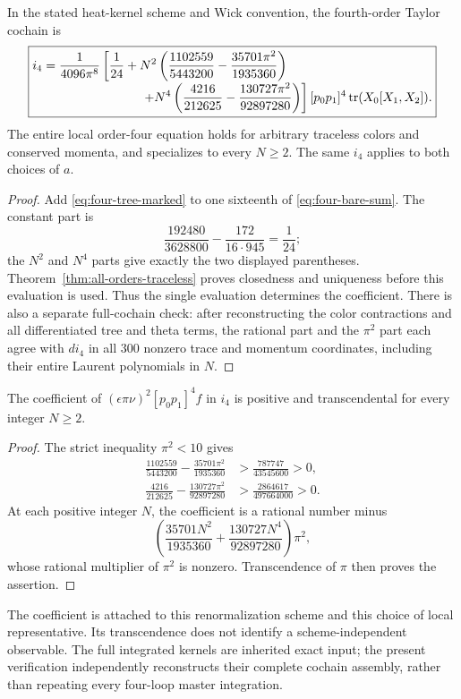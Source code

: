 \begin{theorem}
\label{thm:i4}
In the stated heat-kernel scheme and Wick convention, the
fourth-order Taylor cochain is
\begin{equation}
\boxed{\begin{aligned}
 i_4={}&\frac{1}{4096\pi^8}
 \left[
   \frac1{24}
   +N^2\left(\frac{1102559}{5443200}
                       -\frac{35701\pi^2}{1935360}\right)\right.\\[-1mm]
 &\left.\hspace{23mm}
   +N^4\left(\frac{4216}{212625}
                       -\frac{130727\pi^2}{92897280}\right)
 \right][p_0p_1]^4\tr(X_0[X_1,X_2]).
\end{aligned}}
\label{eq:i4}
\end{equation}
The entire local order-four equation holds for arbitrary
traceless colors and conserved momenta, and specializes to
every $N\ge2$. The same $i_4$ applies to both choices of $a$.
\end{theorem}

\begin{proof}
Add \eqref{eq:four-tree-marked} to one sixteenth of
\eqref{eq:four-bare-sum}. The constant part is
\[
 \frac{192480}{3628800}-\frac{172}{16\cdot945}
       =\frac1{24};
\]
the $N^2$ and $N^4$ parts give exactly the two displayed
parentheses. Theorem~\ref{thm:all-orders-traceless} proves
closedness and uniqueness before this evaluation is used.
Thus the single evaluation determines the coefficient.
There is also a separate full-cochain check: after reconstructing
the color contractions and all differentiated tree and theta
terms, the rational part and the $\pi^2$ part each agree with
$di_4$ in all $300$ nonzero trace and momentum coordinates,
including their entire Laurent polynomials in $N$.
\end{proof}

\begin{corollary}
The coefficient of
$(\epsilon\pi\nu)^2[p_0p_1]^4f$ in $i_4$ is positive and
transcendental for every integer $N\ge2$.
\end{corollary}
\begin{proof}
The strict inequality $\pi^2<10$ gives
\begin{align*}
 \frac{1102559}{5443200}
          -\frac{35701\pi^2}{1935360}
    &>\frac{787747}{43545600}>0,\\
 \frac{4216}{212625}
          -\frac{130727\pi^2}{92897280}
    &>\frac{2864617}{497664000}>0.
\end{align*}
At each positive integer $N$, the coefficient is a rational
number minus
\[
 \left(\frac{35701N^2}{1935360}
              +\frac{130727N^4}{92897280}\right)\pi^2 ,
\]
whose rational multiplier of $\pi^2$ is nonzero.
Transcendence of $\pi$ then proves the assertion.
\end{proof}

The coefficient is attached to this renormalization scheme
and this choice of local representative. Its transcendence
does not identify a scheme-independent observable.
The full integrated kernels are inherited exact input;
the present verification independently reconstructs their
complete cochain assembly, rather than repeating every
four-loop master integration.
